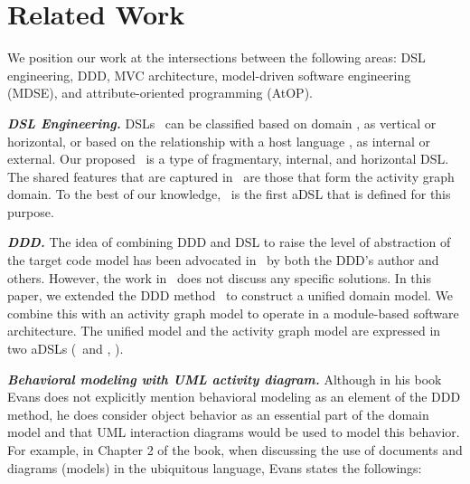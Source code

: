 %
\section{Related Work}\label{sect:relatedwork} %
We position our work at the intersections between the following areas: DSL engineering, DDD, MVC architecture, model-driven software engineering (MDSE), and attribute-oriented programming (AtOP).

\textbf{\textit{DSL Engineering.}}
DSLs~\cite{van_deursen_domain-specific_2000, mernik_when_2005} can be classified based on domain \cite{kleppe_software_2008}, as vertical or horizontal, or based on the relationship with a host language \cite{fowler_domain-specific_2010, van_deursen_domain-specific_2000, mernik_when_2005}, as internal or external. 
%
Our proposed \agl~is a type of fragmentary, internal, and horizontal DSL. The shared features that are captured in \agl~are those that form the activity graph domain. To the best of our knowledge, \agl~is the first aDSL that is defined for this purpose.

\textbf{\textit{DDD.}}
The idea of combining DDD and DSL to raise the level of 
abstraction of the target code model has been advocated in~\cite{fowler_domain-specific_2010} by both the DDD's author and others. However, the work in~\cite{fowler_domain-specific_2010} does not discuss any specific solutions.
In this paper, we extended the DDD method~\cite{evans_domain-driven_2004} to construct a unified domain model. We combine this with an activity graph model to operate in a module-based software architecture. The unified model and the activity graph model are expressed in two aDSLs (\dcsl~and \agl, \resp).

\textbf{\textit{Behavioral modeling with UML activity diagram.}}
Although in his book~\cite{evans_domain-driven_2004} Evans does not explicitly mention behavioral modeling as an element of the DDD method, he does consider object behavior as an essential part of the domain model and that UML interaction diagrams would be used to model this behavior. For example, in Chapter 2 of the book, when discussing the use of documents and diagrams (\ie models) in the ubiquitous language, Evans states the followings:

